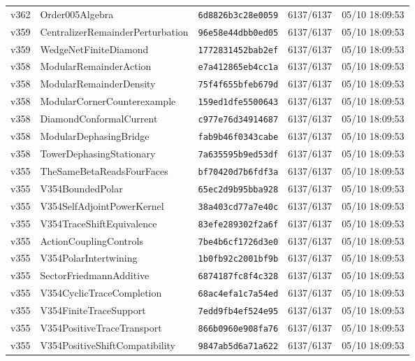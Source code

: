 \documentclass[11pt]{article}
\theoremstyle{definition}\newtheorem{deriv}{Derivação}
\begin{document}
{\begin{longtable}{@{}lllll@{}}
v362 & Order005Algebra & \texttt{6d8826b3c28e0059} & 6137/6137 & 05/10 18:09:53 \\
v359 & CentralizerRemainderPerturbation & \texttt{96e58e44dbb0ed05} & 6137/6137 & 05/10 18:09:53 \\
v359 & WedgeNetFiniteDiamond & \texttt{1772831452bab2ef} & 6137/6137 & 05/10 18:09:53 \\
v358 & ModularRemainderAction & \texttt{e7a412865eb4cc1a} & 6137/6137 & 05/10 18:09:53 \\
v358 & ModularRemainderDensity & \texttt{75f4f655bfeb679d} & 6137/6137 & 05/10 18:09:53 \\
v358 & ModularCornerCounterexample & \texttt{159ed1dfe5500643} & 6137/6137 & 05/10 18:09:53 \\
v358 & DiamondConformalCurrent & \texttt{c977e76d34914687} & 6137/6137 & 05/10 18:09:53 \\
v358 & ModularDephasingBridge & \texttt{fab9b46f0343cabe} & 6137/6137 & 05/10 18:09:53 \\
v358 & TowerDephasingStationary & \texttt{7a635595b9ed53df} & 6137/6137 & 05/10 18:09:53 \\
v355 & TheSameBetaReadsFourFaces & \texttt{bf70420d7b6fdf3a} & 6137/6137 & 05/10 18:09:53 \\
v355 & V354BoundedPolar & \texttt{65ec2d9b95bba928} & 6137/6137 & 05/10 18:09:53 \\
v355 & V354SelfAdjointPowerKernel & \texttt{38a403cd77a7e40c} & 6137/6137 & 05/10 18:09:53 \\
v355 & V354TraceShiftEquivalence & \texttt{83efe289302f2a6f} & 6137/6137 & 05/10 18:09:53 \\
v355 & ActionCouplingControls & \texttt{7be4b6cf1726d3e0} & 6137/6137 & 05/10 18:09:53 \\
v355 & V354PolarIntertwining & \texttt{1b0fb92c2001bf9b} & 6137/6137 & 05/10 18:09:53 \\
v355 & SectorFriedmannAdditive & \texttt{6874187fc8f4c328} & 6137/6137 & 05/10 18:09:53 \\
v355 & V354CyclicTraceCompletion & \texttt{68ac4efa1c7a54ed} & 6137/6137 & 05/10 18:09:53 \\
v355 & V354FiniteTraceSupport & \texttt{7edd9fb4ef524e95} & 6137/6137 & 05/10 18:09:53 \\
v355 & V354PositiveTraceTransport & \texttt{866b0960e908fa76} & 6137/6137 & 05/10 18:09:53 \\
v355 & V354PositiveShiftCompatibility & \texttt{9847ab5d6a71a622} & 6137/6137 & 05/10 18:09:53 \\

\end{longtable}}
\end{document}

